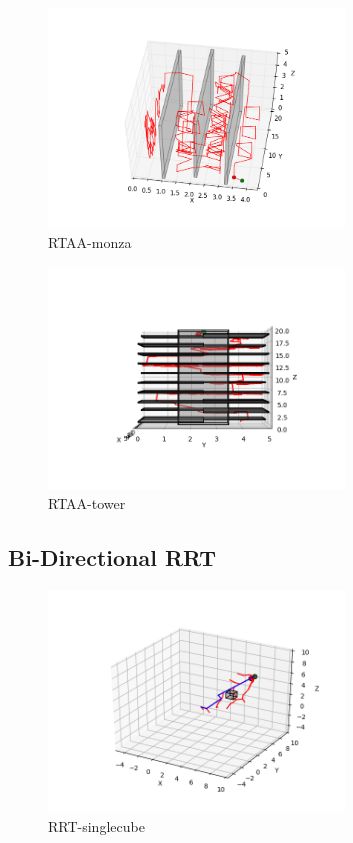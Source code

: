 \documentclass{article} %
\begin{document}
\begin{figure}[H]
	\centering
    \includegraphics[width=0.7\textwidth]{./images/RTAA-monza.png}
    \caption{RTAA-monza}
    \label{RTAA-monza}
\end{figure}

\begin{figure}[H]
	\centering
    \includegraphics[width=0.7\textwidth]{./images/RTAA-tower.png}
    \caption{RTAA-tower}
    \label{RTAA-tower}
\end{figure}

\subsection{Bi-Directional RRT}

\begin{figure}[H]
	\centering
    \includegraphics[width=0.7\textwidth]{./images/RRT-singlecube.png}
    \caption{RRT-singlecube}
    \label{RRT-singlecube}
\end{figure}
\end{document}
